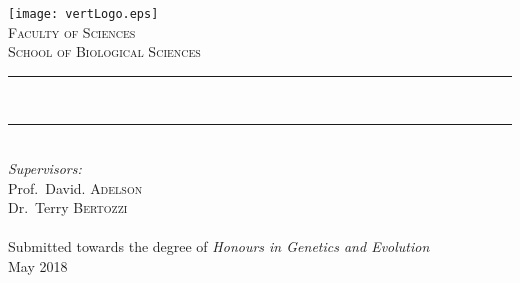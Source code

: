 
\newcommand{\HRule}{\rule{\linewidth}{0.5mm}}

\begin{titlepage}
\vspace*{-2cm}


\begin{center}
\makeatletter
\texttt{[image: vertLogo.eps]}\\[1.2cm]   
\textsc{\large Faculty of Sciences}\\[0.2cm]
\textsc{\large School of Biological Sciences}\\[0.3cm]
\HRule 
\vspace{0.3cm}
\textsc{\Large{\@title}}\\[0.2cm]
\HRule 
\vspace{0.3cm}
\large \@author \\[0.35cm]
\emph{Supervisors:} \\
Prof.~David. \textsc{Adelson} \\
Dr.~Terry \textsc{Bertozzi} \\
~\\
Submitted towards the degree of \emph{Honours in Genetics and Evolution}\\
{\large May 2018}
\vfill


\end{center}


\end{titlepage}


